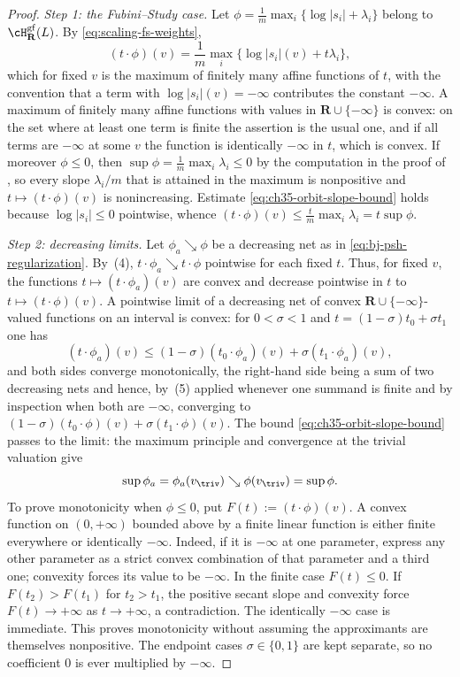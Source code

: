 \begin{proof}
\emph{Step 1: the Fubini--Study case.}
Let $\phi=\frac1m\max_i\{\log|s_i|+\lambda_i\}$ belong to
$\cH^{\mathrm{gf}}_{\mathbf R}(L)$.  By
\eqref{eq:scaling-fs-weights},
\[
 (t\cdot\phi)(v)=\frac1m\max_i\{\log|s_i|(v)+t\lambda_i\},
\]
which for fixed $v$ is the maximum of finitely many affine functions of
$t$, with the convention that a term with
$\log|s_i|(v)=-\infty$ contributes the constant $-\infty$.  A maximum of
finitely many affine functions with values in
$\mathbf R\cup\{-\infty\}$ is convex: on the set where at least one term
is finite the assertion is the usual one, and if all terms are
$-\infty$ at some $v$ the function is identically $-\infty$ in
$t$, which is convex.  If moreover $\phi\leq0$, then
$\sup\phi=\frac1m\max_i\lambda_i\leq0$ by the computation in the proof of
, so every slope
$\lambda_i/m$ that is attained in the maximum is nonpositive and
$t\mapsto(t\cdot\phi)(v)$ is nonincreasing.  Estimate
\eqref{eq:ch35-orbit-slope-bound} holds because
$\log|s_i|\leq0$ pointwise, whence
$(t\cdot\phi)(v)\leq\frac tm\max_i\lambda_i=t\sup\phi$.

\emph{Step 2: decreasing limits.}
Let $\phi_a\searrow\phi$ be a decreasing net as in
\eqref{eq:bj-psh-regularization}.  By
\,(4), $t\cdot\phi_a\searrow t\cdot\phi$
pointwise for each fixed $t$.  Thus, for fixed $v$, the functions
$t\mapsto(t\cdot\phi_a)(v)$ are convex and decrease pointwise in $t$ to
$t\mapsto(t\cdot\phi)(v)$.  A pointwise limit of a decreasing net of
convex $\mathbf R\cup\{-\infty\}$-valued functions on an interval is
convex: for $0<\sigma<1$ and
$t=(1-\sigma)t_0+\sigma t_1$ one has
\[
 (t\cdot\phi_a)(v)
 \leq(1-\sigma)(t_0\cdot\phi_a)(v)+\sigma(t_1\cdot\phi_a)(v),
\]
and both sides converge monotonically, the right-hand side being a sum of
two decreasing nets and hence, by
\,(5) applied whenever one summand is finite
and by inspection when both are $-\infty$, converging to
$(1-\sigma)(t_0\cdot\phi)(v)+\sigma(t_1\cdot\phi)(v)$.  The bound \eqref{eq:ch35-orbit-slope-bound} passes to the limit:
the maximum principle and convergence at the trivial valuation give
\[
 \sup\phi_a=\phi_a(v_{\triv})\searrow
 \phi(v_{\triv})=\sup\phi .
\]
To prove monotonicity when $\phi\leq0$, put
$F(t):=(t\cdot\phi)(v)$. A convex function on $(0,+\infty)$ bounded
above by a finite linear function is either finite everywhere or
identically $-\infty$. Indeed, if it is $-\infty$ at one parameter,
express any other parameter as a strict convex combination of that
parameter and a third one; convexity forces its value to be $-\infty$.
In the finite case $F(t)\leq0$. If $F(t_2)>F(t_1)$ for $t_2>t_1$,
the positive secant slope and convexity force $F(t)\to+\infty$ as
$t\to+\infty$, a contradiction. The identically $-\infty$ case is
immediate. This proves monotonicity without assuming the approximants
are themselves nonpositive. The endpoint cases
$\sigma\in\{0,1\}$ are kept separate, so no coefficient $0$ is ever
multiplied by $-\infty$.


\end{proof}
